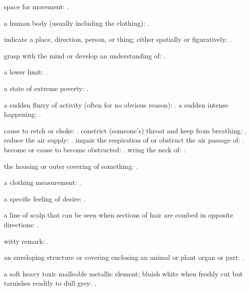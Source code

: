   space for movement:   .

  a human body (usually including the clothing): .

  indicate a place, direction, person, or thing; either spatially or figuratively:   .

  grasp with the mind or develop an understanding of:   .

  a lower limit:   .

  a state of extreme poverty:   .

  a sudden flurry of activity (often for no obvious reason):   . a sudden intense happening:   .

  cause to retch or choke:   . constrict (someone's) throat and keep from breathing:   . reduce the air supply:   . impair the respiration of or obstruct the air passage of:   . become or cause to become obstructed:   . wring the neck of:   .

  the housing or outer covering of something:   .

  a clothing measurement: .

  a specific feeling of desire:   .

  a line of scalp that can be seen when sections of hair are combed in opposite directions:   .

  witty remark:   .

  an enveloping structure or covering enclosing an animal or plant organ or part:   .

  a soft heavy toxic malleable metallic element; bluish white when freshly cut but tarnishes readily to dull grey:   .

